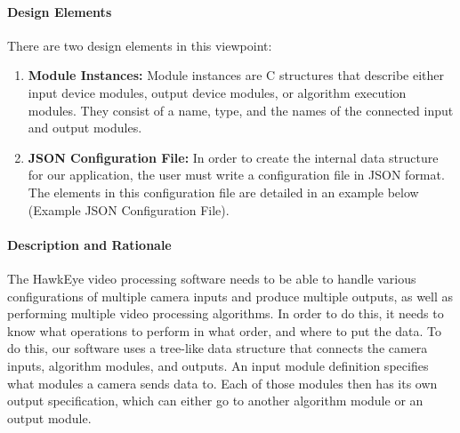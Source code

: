 	\paragraph{Design Elements}
	There are two design elements in this viewpoint:\\
	\begin{enumerate}[leftmargin=2cm,labelindent=2cm]

	\item \textbf{Module Instances:}
	Module instances are C structures that describe either input device modules, output device modules, or algorithm execution modules. They 		consist of a name, type, and the names of the connected input and output modules.
	\item \textbf{JSON Configuration File:}
	In order to create the internal data structure for our application, the user must write a configuration file in JSON format. The elements in this 		configuration file are detailed in an example below (Example JSON Configuration File).\\
	\end{enumerate}
	
	\paragraph{Description and Rationale}
	The HawkEye video processing software needs to be able to handle various configurations of multiple camera inputs and produce multiple outputs, as well as performing multiple video processing algorithms. In order to do this, it needs to know what operations to perform in what order, and where to put the data. To do this, our software uses a tree-like data structure that connects the camera inputs, algorithm modules, and outputs. An input module definition specifies what modules a camera sends data to. Each of those modules then has its own output specification, which can either go to another algorithm module or an output module. \\
	
